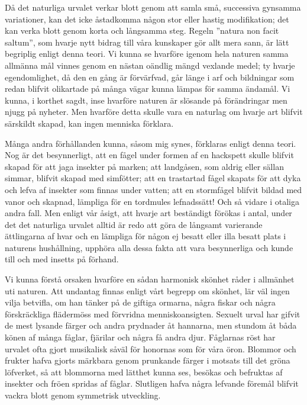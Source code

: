 Då det naturliga urvalet verkar blott genom att samla små, successiva gynsamma variationer, kan det icke åstadkomma någon stor eller hastig modifikation; det kan verka blott genom korta och långsamma steg. Regeln ”natura non facit saltum”, som hvarje nytt bidrag till våra kunskaper gör allt mera sann, är lätt begriplig enligt denna teori. Vi kunna se hvarföre igenom hela naturen samma allmänna mål vinnes genom en nästan oändlig mängd vexlande medel; ty hvarje egendomlighet, då den en gång är förvärfvad, går länge i arf och bildningar som redan blifvit olikartade på många vägar kunna lämpas för samma ändamål. Vi kunna, i korthet sagdt, inse hvarföre naturen är slösande på förändringar men njugg på nyheter. Men hvarföre detta skulle vara en naturlag om hvarje art blifvit särskildt skapad, kan ingen menniska förklara.

Många andra förhållanden kunna, såsom mig synes, förklaras enligt denna teori. Nog är det besynnerligt, att en fågel under formen af en hackspett skulle blifvit skapad för att jaga insekter på marken; att landgåsen, som aldrig eller sällan simmar, blifvit skapad med simfötter; att en trastartad fågel skapats för att dyka och lefva af insekter som finnas under vatten; att en stormfågel blifvit bildad med vanor och skapnad, lämpliga för en tordmules lefnadssätt! Och så vidare i otaliga andra fall. Men enligt vår åsigt, att hvarje art beständigt förökas i antal, under det det naturliga urvalet alltid är redo att göra de långsamt varierande ättlingarna af hvar och en lämpliga för någon ej besatt eller illa besatt plats i naturens hushållning, upphöra alla dessa fakta att vara besynnerliga och kunde till och med insetts på förhand.

Vi kunna förstå orsaken hvarföre en sådan harmonisk skönhet råder i allmänhet uti naturen. Att undantag finnas enligt vårt begrepp om skönhet, lär väl ingen vilja betvifla, om han tänker på de giftiga ormarna, några fiskar och några förskräckliga flädermöss med förvridna menniskoansigten. Sexuelt urval har gifvit de mest lysande färger och andra prydnader åt hannarna, men stundom åt båda könen af många fåglar, fjärilar och några få andra djur. Fåglarnas röst har urvalet ofta gjort musikalisk såväl för honornas som för våra öron. Blommor och frukter hafva gjorts märkbara genom prunkande färger i motsats till det gröna löfverket, så att blommorna med lätthet kunna ses, besökas och befruktas af insekter och fröen spridas af fåglar. Slutligen hafva några lefvande föremål blifvit vackra blott genom symmetrisk utveckling.


